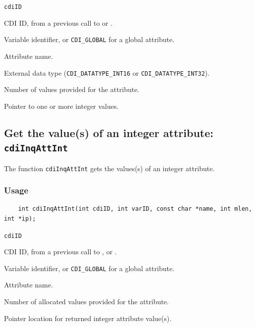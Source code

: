 \hspace*{4mm}\begin{minipage}[]{15cm}
\begin{deflist}{\texttt{cdiID}\ }
\item[\texttt{cdiID}]
CDI ID, from a previous call to {} or {}.
\item[\texttt{varID}]
Variable identifier, or {\texttt{CDI\_GLOBAL}} for a global attribute.
\item[\texttt{name}]
Attribute name.
\item[\texttt{type}]
External data type ({\texttt{CDI\_DATATYPE\_INT16}} or {\texttt{CDI\_DATATYPE\_INT32}}).
\item[\texttt{len}]
Number of values provided for the attribute.
\item[\texttt{ip}]
Pointer to one or more integer values.

\end{deflist}
\end{minipage}


\subsection{Get the value(s) of an integer attribute: \texttt{cdiInqAttInt}}
\label{cdiInqAttInt}

The function {\texttt{cdiInqAttInt}} gets the values(s) of an integer attribute.

\subsubsection*{Usage}

\begin{verbatim}
    int cdiInqAttInt(int cdiID, int varID, const char *name, int mlen, int *ip);
\end{verbatim}

\hspace*{4mm}\begin{minipage}[]{15cm}
\begin{deflist}{\texttt{cdiID}\ }
\item[\texttt{cdiID}]
CDI ID, from a previous call to {}, {} or {}.
\item[\texttt{varID}]
Variable identifier, or {\texttt{CDI\_GLOBAL}} for a global attribute.
\item[\texttt{name}]
Attribute name.
\item[\texttt{mlen}]
Number of allocated values provided for the attribute.
\item[\texttt{ip}]
Pointer location for returned integer attribute value(s).

\end{deflist}
\end{minipage}


